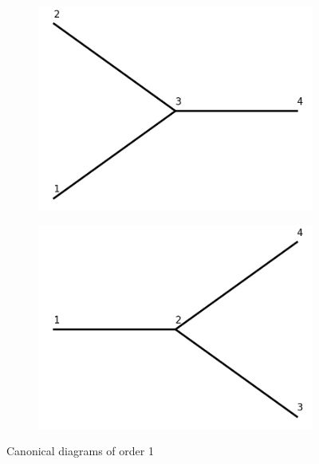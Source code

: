 \documentclass[11pt,a4paper,twoside,pdf]{article}
\numberwithin{equation}{section}
\begin{document}
\begin{figure}[h!]
    \centering
    \begin{subfigure}[t]{0.33\textwidth}
        \centering
        \includegraphics[width=\textwidth]{plots/1to2label.png}
        \caption{ }
        \label{fig:cannonical1_1}
    \end{subfigure}%
    \quad \raisebox{4.5\height}{\LARGE $+$}\quad
    \begin{subfigure}[t]{0.33\textwidth}
        \centering
        \includegraphics[width=\textwidth]{plots/2to1label.png}
        \caption{ }
        \label{fig:cannonical1_2}
    \end{subfigure}
    \caption{Canonical diagrams of order 1}
    \label{fig:cannonical1}
\end{figure}
\end{document}
